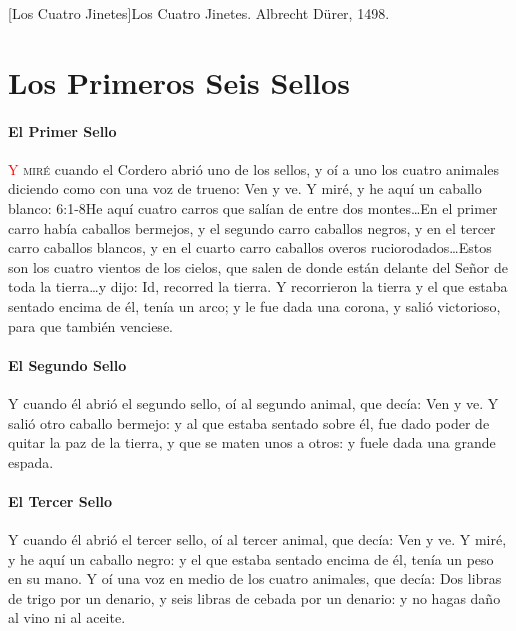 [Los Cuatro Jinetes]{Los Cuatro Jinetes. Albrecht Dürer, 1498.}

\chapter{Los Primeros Seis Sellos}
\subsubsection*{El Primer Sello}
\lettrine[lines=3,slope=-0.5em,loversize=0.1]{\textcolor{red}{Y}}{\hspace{0.5em} miré} cuando el Cordero abrió uno de los sellos, y oí a uno los cuatro animales diciendo como con una voz de trueno: Ven y ve. 
Y miré, y he aquí un caballo blanco:%
					{6:1-8}{He aquí cuatro carros que salían de entre dos montes\ldots En el primer carro había caballos bermejos, y el segundo carro caballos negros, y en el tercer carro caballos blancos, y en el cuarto carro caballos overos ruciorodados\ldots Estos son los cuatro vientos de los cielos, que salen de donde están delante del Señor de toda la tierra\ldots y dijo: Id, recorred la tierra. Y recorrieron la tierra}
 y el que estaba sentado encima de él, tenía un arco; y le fue dada una corona, y salió victorioso, para que también venciese.
\subsubsection*{El Segundo Sello}
Y cuando él abrió el segundo sello, oí al segundo animal, que decía: Ven y ve. %
Y salió otro caballo bermejo: y al que estaba sentado sobre él, fue dado poder de quitar la paz de la tierra, y que se maten unos a otros: y fuele dada una grande espada.
\subsubsection*{El Tercer Sello}
Y cuando él abrió el tercer sello, oí al tercer animal, que decía: Ven y ve. Y miré, y he aquí un caballo negro: y el que estaba sentado encima de él, tenía un peso en su mano. %
Y oí una voz en medio de los cuatro animales, que decía: Dos libras de trigo por un denario, y seis libras de cebada por un denario: y no hagas daño al vino ni al aceite.
